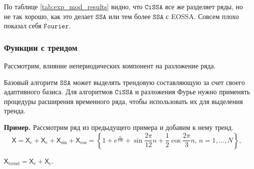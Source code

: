 \documentclass[12pt, specialist, subf
]{disser}
\theoremstyle{definition}
\newcommand{\SSA}{\texttt{SSA}}
\newcommand{\CISSA}{\texttt{CiSSA}}
\newcommand{\FOURIER}{\texttt{Fourier}}
\newcommand{\TS}{\mathsf{X}}
\begin{document}
По таблице \ref{tab:exp_mod_results} видно, что $\CISSA$ все же разделяет ряды, но не так хорошо, как это делает $\SSA$ или тем более $\SSA$ с EOSSA. Совсем плохо показал себя $\FOURIER$.


\subsubsection{Функции с трендом}



\label{subsubsec:trend}

Рассмотрим, влияние непериодических компонент на разложение ряда.

Базовый алгоритм $\SSA$ может выделять трендовую составляющую за счет своего адаптивного базиса. Для алгоритмов $\CISSA$ и разложения Фурье нужно применять процедуры расширения временного ряда, чтобы использовать их для выделения тренда.

\textbf{\large{Пример.}} Рассмотрим ряд из предыдущего примера и добавим к нему тренд. \[
\TS = \TS_{c} + \TS_e + \TS_{\sin} + \TS_{\cos} = 
\left\{
	1 + e^{\frac{n}{100}} + \sin{\frac{2\pi}{12}n} + \frac{1}{2}\cos{\frac{2\pi}{3}n}, \, n = 1, \dots, N
\right\}, \]

$\TS_{\mathrm{trend}} = \TS_{c} + \TS_e$.
\end{document}
